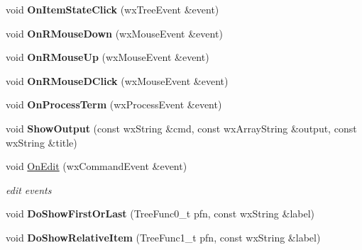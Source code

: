 \begin{DoxyCompactItemize}
\item 
\hypertarget{class_my_frame_af96760e4df77d847717e6afdf9cfec3e}{void {\bfseries On\+Item\+State\+Click} (wx\+Tree\+Event \&event)}\label{class_my_frame_af96760e4df77d847717e6afdf9cfec3e}

\item 
\hypertarget{class_my_frame_a24f5ddc6515b02efd2cb7079f42988b0}{void {\bfseries On\+R\+Mouse\+Down} (wx\+Mouse\+Event \&event)}\label{class_my_frame_a24f5ddc6515b02efd2cb7079f42988b0}

\item 
\hypertarget{class_my_frame_a2333ce08a9debddbad12c2ecf7abd1ba}{void {\bfseries On\+R\+Mouse\+Up} (wx\+Mouse\+Event \&event)}\label{class_my_frame_a2333ce08a9debddbad12c2ecf7abd1ba}

\item 
\hypertarget{class_my_frame_a8c4128e1104471317fd37e3985d9063f}{void {\bfseries On\+R\+Mouse\+D\+Click} (wx\+Mouse\+Event \&event)}\label{class_my_frame_a8c4128e1104471317fd37e3985d9063f}

\item 
\hypertarget{class_my_frame_a4d3bd40c8abd4779d62e388688b4b49e}{void {\bfseries On\+Process\+Term} (wx\+Process\+Event \&event)}\label{class_my_frame_a4d3bd40c8abd4779d62e388688b4b49e}

\item 
\hypertarget{class_my_frame_a6a4652f2e55b5be34781be6f936ee69d}{void {\bfseries Show\+Output} (const wx\+String \&cmd, const wx\+Array\+String \&output, const wx\+String \&title)}\label{class_my_frame_a6a4652f2e55b5be34781be6f936ee69d}

\item 
\hypertarget{class_my_frame_a695b023f086392b01e9bc35278a173e4}{void \hyperlink{class_my_frame_a695b023f086392b01e9bc35278a173e4}{On\+Edit} (wx\+Command\+Event \&event)}\label{class_my_frame_a695b023f086392b01e9bc35278a173e4}

\begin{DoxyCompactList}\small\item\em edit events \end{DoxyCompactList}\item 
\hypertarget{class_my_frame_a489f24a7f22c96c0db2428c56cc8fd23}{void {\bfseries Do\+Show\+First\+Or\+Last} (Tree\+Func0\+\_\+t pfn, const wx\+String \&label)}\label{class_my_frame_a489f24a7f22c96c0db2428c56cc8fd23}

\item 
\hypertarget{class_my_frame_a3b99729ec888ea071d7e43c5bda4dfd6}{void {\bfseries Do\+Show\+Relative\+Item} (Tree\+Func1\+\_\+t pfn, const wx\+String \&label)}\label{class_my_frame_a3b99729ec888ea071d7e43c5bda4dfd6}


\end{DoxyCompactItemize}
